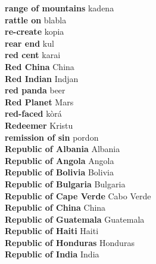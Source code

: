 \textbf{ range of mountains  } kadena \\
\textbf{ rattle on  } blabla \\
\textbf{ re-create  } kopia \\
\textbf{ rear end  } kul \\
\textbf{ red cent  } karai \\
\textbf{ Red China  } China \\
\textbf{ Red Indian  } Indjan \\
\textbf{ red panda  } beer \\
\textbf{ Red Planet  } Mars \\
\textbf{ red-faced  } kòrá \\
\textbf{ Redeemer  } Kristu \\
\textbf{ remission of sin  } pordon \\
\textbf{ Republic of Albania  } Albania \\
\textbf{ Republic of Angola  } Angola \\
\textbf{ Republic of Bolivia  } Bolivia \\
\textbf{ Republic of Bulgaria  } Bulgaria \\
\textbf{ Republic of Cape Verde  } Cabo Verde \\
\textbf{ Republic of China  } China \\
\textbf{ Republic of Guatemala  } Guatemala \\
\textbf{ Republic of Haiti  } Haiti \\
\textbf{ Republic of Honduras  } Honduras \\
\textbf{ Republic of India  } India \\
